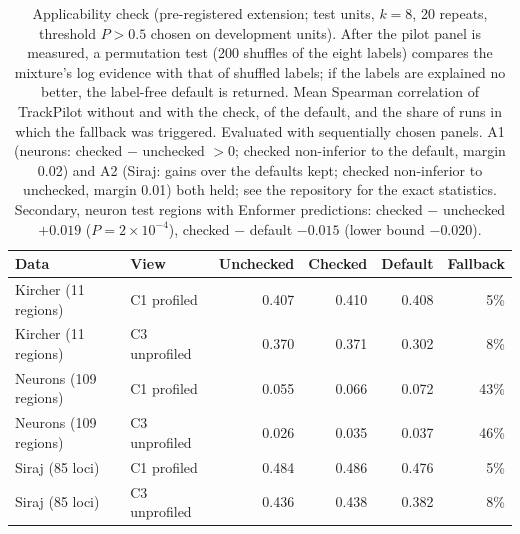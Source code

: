 \begin{table}[H]
\caption{Applicability check (pre-registered extension; test units, $k=8$, 20 repeats, threshold $P>0.5$ chosen on development units). After the pilot panel is measured, a permutation test (200 shuffles of the eight labels) compares the mixture's log evidence with that of shuffled labels; if the labels are explained no better, the label-free default is returned. Mean Spearman correlation of TrackPilot without and with the check, of the default, and the share of runs in which the fallback was triggered. Evaluated with sequentially chosen panels. A1 (neurons: checked $-$ unchecked $>0$; checked non-inferior to the default, margin 0.02) and A2 (Siraj: gains over the defaults kept; checked non-inferior to unchecked, margin 0.01) both held; see the repository for the exact statistics. Secondary, neuron test regions with Enformer predictions: checked $-$ unchecked $+0.019$ ($P=2\times10^{-4}$), checked $-$ default $-0.015$ (lower bound $-0.020$).}\label{tab:s11}
\centering\small
\begin{tabular}{llrrrr}
\toprule
Data & View & Unchecked & Checked & Default & Fallback \\
\midrule
Kircher (11 regions) & C1 profiled & 0.407 & 0.410 & 0.408 & 5\% \\
Kircher (11 regions) & C3 unprofiled & 0.370 & 0.371 & 0.302 & 8\% \\
Neurons (109 regions) & C1 profiled & 0.055 & 0.066 & 0.072 & 43\% \\
Neurons (109 regions) & C3 unprofiled & 0.026 & 0.035 & 0.037 & 46\% \\
Siraj (85 loci) & C1 profiled & 0.484 & 0.486 & 0.476 & 5\% \\
Siraj (85 loci) & C3 unprofiled & 0.436 & 0.438 & 0.382 & 8\% \\
\bottomrule
\end{tabular}
\end{table}

